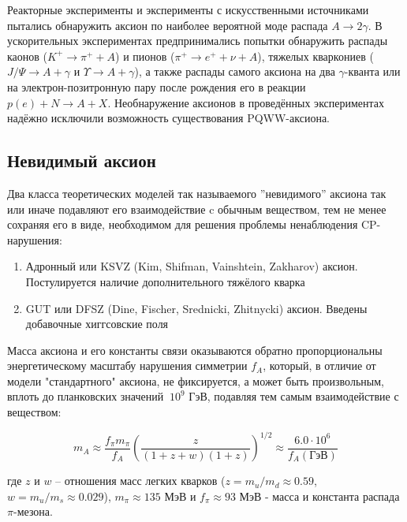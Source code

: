 \documentclass[a4paper,article,14pt]{extarticle}
\begin{document}
Реакторные эксперименты и эксперименты с искусственными источниками \cite{ReactorExperiment1, ReactorExperiment2} пытались обнаружить аксион по наиболее вероятной моде распада $A \rightarrow 2\gamma$. В ускорительных экспериментах \cite{AcceleratorExperiment1, AcceleratorExperiment2} предпринимались попытки обнаружить распады каонов ($K^+ \rightarrow \pi^+ + A$) и пионов ($\pi^+ \rightarrow e^+ + \nu + A$), тяжелых кваркониев ($ J/\Psi \rightarrow A + \gamma $ и $ \Upsilon \rightarrow A + \gamma $), а также распады самого аксиона на два $\gamma$-кванта или на электрон-позитронную пару после рождения его в реакции $ p\left(e\right) + N \rightarrow A + X $. Необнаружение аксионов в проведённых экспериментах надёжно исключили возможность существования PQWW-аксиона.

\subsection{Невидимый аксион}
Два класса теоретических моделей так называемого ”невидимого” аксиона так или иначе подавляют его взаимодействие c обычным веществом, тем не менее сохраняя его в виде, необходимом для решения проблемы ненаблюдения CP-нарушения:
\begin{enumerate}
    \item  Адронный или KSVZ (Kim, Shifman, Vainshtein, Zakharov) \cite{K,SVZ} аксион. Постулируется наличие дополнительного тяжёлого кварка
    \item GUT или DFSZ (Dine, Fischer, Srednicki, Zhitnycki) \cite{DFS,Z} \mbox{аксион}. Введены добавочные хиггсовские поля
\end{enumerate}

Масса аксиона и его константы связи оказываются обратно пропорциональны энергетическому масштабу нарушения симметрии $f_A$, который, в отличие от модели "стандартного" аксиона, не фиксируется, а может быть произвольным, вплоть до планковских значений $~10^9 \text{ ГэВ}$, подавляя тем самым взаимодействие с веществом:

\begin{equation}
    {m_A}\approx\frac{{{f_\pi }{m_\pi }}}{{{f_A}}} \left( \frac{z}{{\left( {1 + z + w} \right)\left( {1 + z} \right)}} \right)^{1/2} \approx \frac{{6.0 \cdot {{10}^6}}}{{{f_A}\left( \text{ГэВ} \right)}}
    \label{mA}
\end{equation}

где $z$ и $w$ – отношения масс легких кварков ($z = m_u/m_d \approx 0.59$, $w = m_u/m_s \approx 0.029 $), $m_{\pi} \approx 135 \text{ МэВ}$ и $f_{\pi} \approx 93 \text{ МэВ}$ - масса и константа распада $\pi$-мезона.
\end{document}
